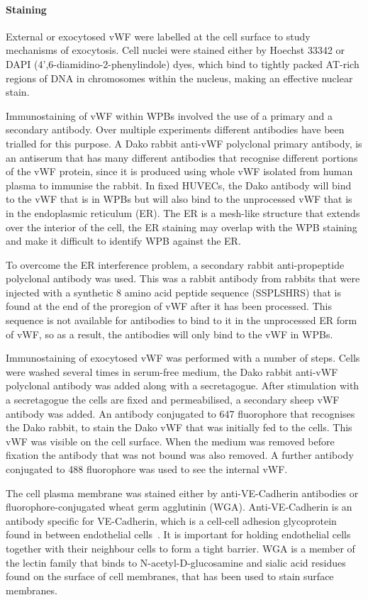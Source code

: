 \paragraph{Staining}
External or exocytosed vWF were labelled at the cell surface to study mechanisms of exocytosis. Cell nuclei were stained either by Hoechst 33342 or DAPI (4',6-diamidino-2-phenylindole) dyes, which bind to tightly packed AT-rich regions of DNA in chromosomes within the nucleus, making an effective nuclear stain.

Immunostaining of vWF within WPBs involved the use of a primary and a secondary antibody. Over multiple experiments different antibodies have been trialled for this purpose. A Dako rabbit anti-vWF polyclonal primary antibody, is an antiserum that has many different antibodies that recognise different portions of the vWF protein, since it is produced using whole vWF isolated from human plasma to immunise the rabbit. In fixed HUVECs, the Dako antibody will bind to the vWF that is in WPBs but will also bind to the unprocessed vWF that is in the endoplasmic reticulum (ER). The ER is a mesh-like structure that extends over the interior of the cell, the ER staining may overlap with the WPB staining and make it difficult to identify WPB against the ER.

To overcome the ER interference problem, a secondary rabbit anti-propeptide polyclonal antibody was used. This was a rabbit antibody from rabbits that were injected with a synthetic 8 amino acid peptide sequence (SSPLSHRS) that is found at the end of the proregion of vWF after it has been processed. This sequence is not available for antibodies to bind to it in the unprocessed ER form of vWF, so as a result, the antibodies will only bind to the vWF in WPBs.

Immunostaining of exocytosed vWF was performed with a number of steps. Cells were washed several times in serum-free medium, the Dako rabbit anti-vWF polyclonal antibody was added along with a secretagogue. After stimulation with a secretagogue the cells are fixed and permeabilised, a secondary sheep vWF antibody was added. An antibody conjugated to 647 fluorophore that recognises the Dako rabbit, to stain the Dako vWF that was initially fed to the cells. This vWF was visible on the cell surface. When the medium was removed before fixation the antibody that was not bound was also removed. A further antibody conjugated to 488 fluorophore was used to see the internal vWF.

The cell plasma membrane was stained either by anti-VE-Cadherin antibodies or fluorophore-conjugated wheat germ agglutinin (WGA). Anti-VE-Cadherin is an antibody specific for VE-Cadherin, which is a cell-cell adhesion glycoprotein found in between endothelial cells~\cite{Vestweber2008}. It is important for holding endothelial cells together with their neighbour cells to form a tight barrier. WGA is a member of the lectin family that binds to N-acetyl-D-glucosamine and sialic acid residues found on the surface of cell membranes, that has been used to stain surface membranes.

